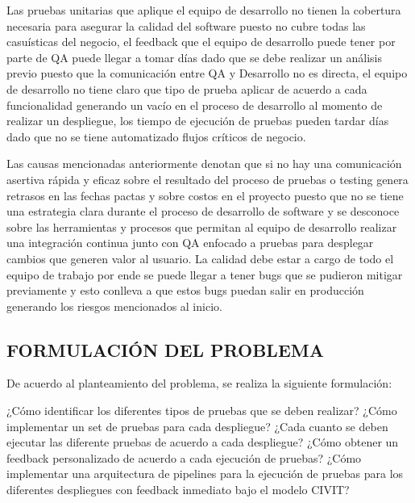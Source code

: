 Las pruebas unitarias que aplique el equipo de desarrollo no tienen la cobertura necesaria para asegurar la calidad del software puesto no cubre todas las casuísticas del negocio, el feedback que el equipo de desarrollo puede tener por parte de QA puede llegar a tomar días dado que se debe realizar un análisis previo puesto que la comunicación entre QA y Desarrollo no es directa, el equipo de desarrollo no tiene claro que tipo de prueba aplicar de acuerdo a cada funcionalidad generando un vacío en el proceso de desarrollo al momento de realizar un despliegue, los tiempo de ejecución de pruebas pueden tardar días dado que no se tiene automatizado flujos críticos de negocio.

Las causas mencionadas anteriormente denotan que si no hay una comunicación  asertiva rápida y eficaz sobre el resultado del proceso de pruebas o testing genera retrasos en las fechas pactas y sobre costos en el proyecto puesto que no se tiene una estrategia clara durante el proceso de desarrollo de software y se desconoce sobre las herramientas y procesos que permitan al equipo de desarrollo realizar una integración continua junto con QA enfocado a pruebas para desplegar cambios que generen valor al usuario. La calidad debe estar a cargo de todo el equipo de trabajo por ende se puede llegar a tener bugs que se pudieron mitigar previamente y esto conlleva a que estos bugs puedan salir en producción generando los riesgos mencionados al inicio.

\subsection{FORMULACIÓN DEL PROBLEMA}
De acuerdo al planteamiento del problema, se realiza la siguiente formulación:

¿Cómo identificar los diferentes tipos de pruebas que se deben realizar?
¿Cómo implementar un set de pruebas para cada despliegue?
¿Cada cuanto se deben ejecutar las diferente pruebas de acuerdo a cada despliegue?
¿Cómo obtener un feedback personalizado de acuerdo a cada ejecución de pruebas?
¿Cómo implementar una arquitectura de pipelines para la ejecución de pruebas para los diferentes despliegues con feedback inmediato bajo el modelo CIVIT?
